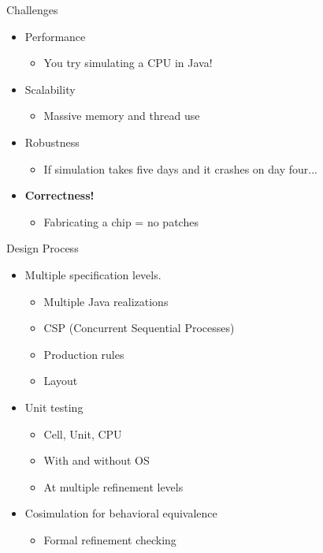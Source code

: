 \documentclass[%
final,
slideColor,
nototal,
nocolorBG,
pdf,
accumulate,
next,
]{prosper}
\begin{document}
\begin{slide}{Challenges}
  \begin{itemize}
  \item Performance
    \begin{itemize}
    \item You try simulating a CPU in Java!
    \end{itemize}
  \item Scalability
    \begin{itemize}
    \item Massive memory and thread use
    \end{itemize}
  \item Robustness
    \begin{itemize}
    \item If simulation takes five days and it crashes on day four...
    \end{itemize}
  \item \textbf{Correctness!}
    \begin{itemize}
    \item Fabricating a chip = no patches
    \end{itemize}
  \end{itemize}
\end{slide}

\begin{slide}{Design Process}
  \begin{itemize}
  \item Multiple specification levels.
    \begin{itemize}
    \item Multiple Java realizations
    \item CSP (Concurrent Sequential Processes)
    \item Production rules
    \item Layout
    \end{itemize}
  \item Unit testing
    \begin{itemize}
    \item Cell, Unit, CPU
    \item With and without OS
    \item At multiple refinement levels
    \end{itemize}
  \item Cosimulation for behavioral equivalence
    \begin{itemize}
    \item Formal refinement checking
    \end{itemize}
  \end{itemize}
\end{slide}
\end{document}
